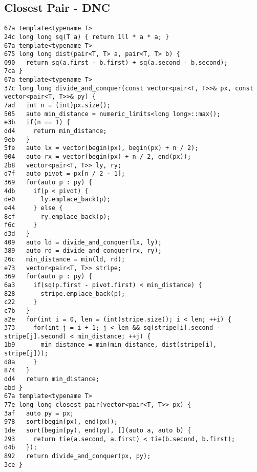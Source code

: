 \documentclass[10pt, a4paper, twoside]{article}
\begin{document}
\subsection{Closest Pair - DNC}
\begin{lstlisting}
67a template<typename T>
24c long long sq(T a) { return 1ll * a * a; }
67a template<typename T>
675 long long dist(pair<T, T> a, pair<T, T> b) {
090   return sq(a.first - b.first) + sq(a.second - b.second);
7ca }
67a template<typename T>
37c long long divide_and_conquer(const vector<pair<T, T>>& px, const vector<pair<T, T>>& py) {
7ad   int n = (int)px.size();
505   auto min_distance = numeric_limits<long long>::max();
e3b   if(n == 1) {
dd4     return min_distance;
9eb   }
5fe   auto lx = vector(begin(px), begin(px) + n / 2);
904   auto rx = vector(begin(px) + n / 2, end(px));
2b8   vector<pair<T, T>> ly, ry;
d7f   auto pivot = px[n / 2 - 1];
369   for(auto p : py) {
4db     if(p < pivot) {
de0       ly.emplace_back(p);
e44     } else {
8cf       ry.emplace_back(p);
f6c     }
d3d   }
409   auto ld = divide_and_conquer(lx, ly);
389   auto rd = divide_and_conquer(rx, ry);
26c   min_distance = min(ld, rd);
e73   vector<pair<T, T>> stripe;
369   for(auto p : py) {
6a3     if(sq(p.first - pivot.first) < min_distance) {
828       stripe.emplace_back(p);
c22     }
c7b   }
a2e   for(int i = 0, len = (int)stripe.size(); i < len; ++i) {
373     for(int j = i + 1; j < len && sq(stripe[i].second - stripe[j].second) < min_distance; ++j) {
1b9       min_distance = min(min_distance, dist(stripe[i], stripe[j]));
d8a     }
874   }
dd4   return min_distance;
abd }
67a template<typename T>
77e long long closest_pair(vector<pair<T, T>> px) {
3af   auto py = px;
978   sort(begin(px), end(px));
1de   sort(begin(py), end(py), [](auto a, auto b) {
293     return tie(a.second, a.first) < tie(b.second, b.first);
d4b   });
892   return divide_and_conquer(px, py);
3ce }
\end{lstlisting}
\end{document}

